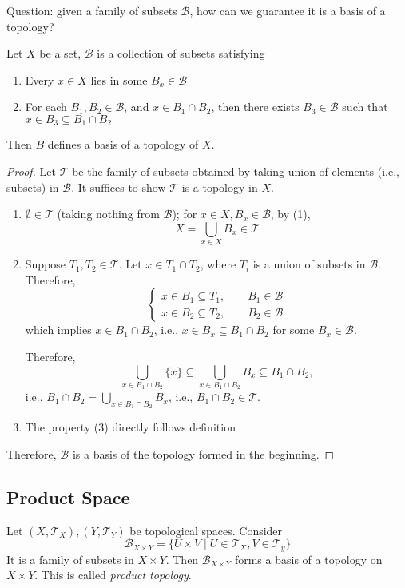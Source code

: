 Question: given a family of subsets $\mathcal{B}$, how can we guarantee it is a basis of a topology?

\begin{proposition}\label{pro:3:4}
Let $X$ be a set, $\mathcal{B}$ is a collection of subsets satisfying
\begin{enumerate}
\item
Every $x\in X$ lies in some $B_x\in\mathcal{B}$
\item
For each $B_1,B_2\in\mathcal{B}$, and $x\in B_1\cap B_2$, then there exists $B_3\in\mathcal{B}$ such that $x\in B_3\subseteq B_1\cap B_2$
\end{enumerate}
Then $B$ defines a basis of a topology of $X$.
\end{proposition}
\begin{proof}
Let $\mathcal{T}$ be the family of subsets obtained by taking union of elements (i.e., subsets) in $\mathcal{B}$. It suffices to show $\mathcal{T}$ is a topology in $X$.
\begin{enumerate}
\item
$\emptyset\in\mathcal{T}$ (taking nothing from $\mathcal{B}$); for $x\in X,B_x\in\mathcal{B}$, by (1),
\[
X=\bigcup_{x\in X}B_x\in\mathcal{T}
\]
\item
Suppose $T_1,T_2\in\mathcal{T}$. Let $x\in T_1\cap T_2 $, where $T_i$ is a union of subsets in $\mathcal{B}$. Therefore,
\[
\left\{
\begin{aligned}
x\in B_1\subseteq T_1,\qquad B_1\in\mathcal{B}\\
x\in B_2\subseteq T_2,\qquad B_2\in\mathcal{B}
\end{aligned}
\right.
\]
which implies $x\in B_1\cap B_2$, i.e., $x\in B_x\subseteq B_1\cap B_2$ for some $B_x\in\mathcal{B}$.

Therefore,
\[
\bigcup_{x\in B_1\cap B_2}\{x\}\subseteq
\bigcup_{x\in B_1\cap B_2}B_x\subseteq B_1\cap B_2,
\]
i.e., $B_1\cap B_2=\bigcup_{x\in B_1\cap B_2}B_x$, i.e., $B_1\cap B_2\in\mathcal{T}$.
\item
The property (3) directly follows definition
\end{enumerate}
Therefore, $\mathcal{B}$ is a basis of the topology formed in the beginning.
\end{proof}

\subsection{Product Space}

\begin{definition}
Let $(X,\mathcal{T}_X),(Y,\mathcal{T}_Y)$ be topological spaces. Consider
\[
\mathcal{B}_{X\times Y}=\{U\times V\mid U\in\mathcal{T}_X,V\in\mathcal{T}_y\}
\]
It is a family of subsets in $X\times Y$. Then $\mathcal{B}_{X\times Y}$ forms a basis of a topology on $X\times Y$. This is called \emph{product topology}.
\end{definition}

